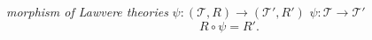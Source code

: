  \emph{morphism of Lawvere theories} $\psi: (\mathcal{T}, R) \longrightarrow (\mathcal{T}', R')$  $\psi: \mathcal{T} \longrightarrow \mathcal{T}'$ 
$$
R \circ \psi = R'.
$$
